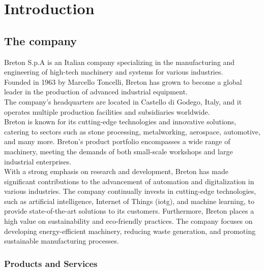 \chapter{Introduction}\label{cap:Introduction}
\section{The company}
Breton S.p.A is an Italian company specializing in the manufacturing and engineering of high-tech machinery and systems for various industries. \\
Founded in 1963 by Marcello Toncelli, Breton has grown to become a global leader in the production of advanced industrial equipment. \\
The company's headquarters are located in Castello di Godego, Italy, 
and it operates multiple production facilities and subsidiaries worldwide.\\
Breton is known for its cutting-edge technologies and innovative solutions, catering to sectors such as stone processing, metalworking, aerospace, automotive, and many more.
Breton's product portfolio encompasses a wide range of machinery, meeting the demands of both small-scale workshops and large industrial enterprises.\\
With a strong emphasis on research and development, Breton has made significant contributions to the advancement of automation and digitalization in various industries. The company continually invests in cutting-edge technologies, such as artificial intelligence, Internet of Things (\gls{iotg}), and machine learning, to provide state-of-the-art solutions to its customers.
Furthermore, Breton places a high value on sustainability and eco-friendly practices. The company focuses on developing energy-efficient machinery, reducing waste generation, and promoting sustainable manufacturing processes.
\subsection{Products and Services}
